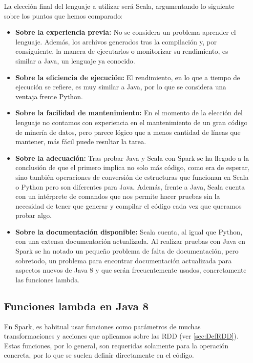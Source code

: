 \newpage


La elección final del lenguaje a utilizar será Scala, argumentando lo siguiente sobre los puntos que hemos comparado:

\begin{itemize}
	\item \textbf{Sobre la experiencia previa:} No se considera un problema aprender el lenguaje. Además, los archivos generados tras la compilación y, por consiguiente, la manera de ejecutarlos o monitorizar su rendimiento, es similar a Java, un lenguaje ya conocido.
	\item \textbf{Sobre la eficiencia de ejecución:} El rendimiento, en lo que a tiempo de ejecución se refiere, es muy similar a Java, por lo que se considera una ventaja frente Python.
	\item \textbf{Sobre la facilidad de mantenimiento:} En el momento de la elección del lenguaje no contamos con experiencia en el mantenimiento de un gran código de minería de datos, pero parece lógico que a menos cantidad de líneas que mantener, más fácil puede resultar la tarea.	
	\item \textbf{Sobre la adecuación:} Tras probar Java y Scala con Spark se ha llegado a la conclusión de que el primero implica no solo más código, como era de esperar, sino también operaciones de conversión de estructuras que funcionan en Scala o Python pero son diferentes para Java. Además, frente a Java, Scala cuenta con un intérprete de comandos que nos permite hacer pruebas sin la necesidad de tener que generar y compilar el código cada vez que queramos probar algo.
	\item \textbf{Sobre la documentación disponible:} Scala cuenta, al igual que Python, con una extensa documentación actualizada. Al realizar pruebas con Java en Spark se ha notado un pequeño problema de falta de documentación, pero sobretodo, un problema para encontrar documentación actualizada para aspectos nuevos de Java 8 y que serán frecuentemente usados, concretamente las funciones lambda.
\end{itemize}

\newpage
\subsection{Funciones lambda en Java 8 } \label{subsec:ExplLambdaJava}

En Spark, es habitual usar funciones como parámetros de muchas transformaciones y acciones que aplicamos sobre las RDD (ver \ref{sec:DefRDD}). Estas funciones, por lo general, son requeridas solamente para la operación concreta, por lo que se suelen definir directamente en el código.

